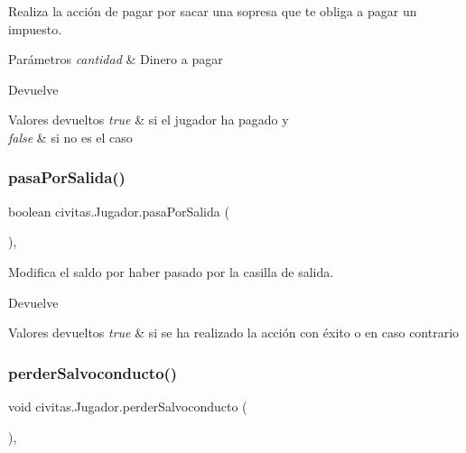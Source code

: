 Realiza la acción de pagar por sacar una sopresa que te obliga a pagar un impuesto. 
\begin{DoxyParams}{Parámetros}
{\em cantidad} & Dinero a pagar \\
\hline
\end{DoxyParams}
\begin{DoxyReturn}{Devuelve}

\end{DoxyReturn}

\begin{DoxyRetVals}{Valores devueltos}
{\em true} & si el jugador ha pagado y \\
\hline
{\em false} & si no es el caso \\
\hline
\end{DoxyRetVals}
\mbox{\label{classcivitas_1_1Jugador_ac876d67da8365c7a97767a2930113c72}} 
\subsubsection{\texorpdfstring{pasa\+Por\+Salida()}{pasaPorSalida()}}
{\footnotesize\ttfamily boolean civitas.\+Jugador.\+pasa\+Por\+Salida (\begin{DoxyParamCaption}{ }\end{DoxyParamCaption})\hspace{0.3cm}{\ttfamily [inline]}, {\ttfamily [package]}}

Modifica el saldo por haber pasado por la casilla de salida. \begin{DoxyReturn}{Devuelve}

\end{DoxyReturn}

\begin{DoxyRetVals}{Valores devueltos}
{\em true} & si se ha realizado la acción con éxito o  en caso contrario \\
\hline
\end{DoxyRetVals}
\mbox{\label{classcivitas_1_1Jugador_a121e27109e4f746fd129175b1622c154}} 
\subsubsection{\texorpdfstring{perder\+Salvoconducto()}{perderSalvoconducto()}}
{\footnotesize\ttfamily void civitas.\+Jugador.\+perder\+Salvoconducto (\begin{DoxyParamCaption}{ }\end{DoxyParamCaption})\hspace{0.3cm}{\ttfamily [inline]}, {\ttfamily [private]}}

